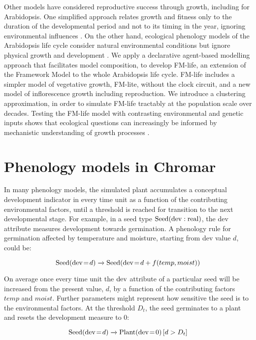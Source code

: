 Other models have considered reproductive success through growth, including for
Arabidopsis. One simplified approach relates growth and fitness only to the
duration of the developmental period and not to its timing in the year, ignoring
environmental influences \citep{prusinkiewicz_evolution_2007}. On the other
hand, ecological phenology models of the Arabidopsis life cycle consider natural
environmental conditions but ignore physical growth and development
\citep{chuine_phenology_2001, chuine_why_2010,burghardt_modeling_2015}. We apply
a declarative agent-based modelling approach that facilitates model composition,
to develop FM-life, an extension of the Framework Model to the whole Arabidopsis
life cycle. FM-life includes a simpler model of vegetative growth, FM-lite,
without the clock circuit, and a new model of inflorescence growth including
reproduction. We introduce a clustering approximation, in order to simulate
FM-life tractably at the population scale over decades. Testing the FM-life
model with contrasting environmental and genetic inputs shows that ecological
questions can increasingly be informed by mechanistic understanding of growth
processes \citep{millar_intracellular_2016, doebeli_towards_2017}.

\section{Phenology models in Chromar}
\label{phenology-models-in-chromar}
In many phenology models, the simulated plant accumulates a conceptual
development indicator in every time unit as a function of the
contributing environmental factors, until a threshold is reached for
transition to the next developmental stage. For example, in a seed type
\(\mathrm{Seed}(\mathrm{dev}:\mathrm{real})\), the dev attribute measures
development towards germination. A phenology rule for germination
affected by temperature and moisture, starting from dev value $d$,
could be:

\[\mathrm{Seed}(\mathrm{dev} \! = \! {d}) \xrightarrow{} \mathrm{Seed}(\mathrm{dev} \! = \! {d + f(temp,moist)}) \]

On average once every time unit the $\mathrm{dev}$ attribute of a
particular seed will be increased from the present value, \(d\), by a
function of the contributing factors $temp$ and
$moist$. Further parameters might represent how sensitive the
seed is to the environmental factors. At the threshold
$D_t$, the seed germinates to a plant and resets the
development measure to 0:

\[\mathrm{Seed}(\mathrm{dev} \! = \! {d}) \xrightarrow{} \mathrm{Plant}(\mathrm{dev} \! = \! {0}) \, \lbrack d > D_{t}\rbrack \]

